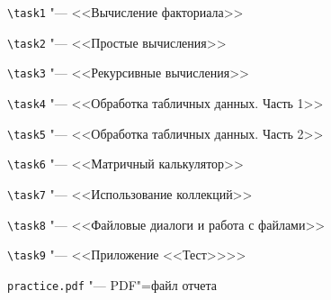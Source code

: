\documentclass[bachelor, och, pract]{SCWorks}
\begin{document}
\begin{desciption}
	\item \verb|\task1| "--- <<Вычисление факториала>>
	\item \verb|\task2| "--- <<Простые вычисления>>
	\item \verb|\task3| "--- <<Рекурсивные вычисления>>
	\item \verb|\task4| "--- <<Обработка табличных данных. Часть 1>>
	\item \verb|\task5| "--- <<Обработка табличных данных. Часть 2>>
	\item \verb|\task6| "--- <<Матричный калькулятор>>
	\item \verb|\task7| "--- <<Использование коллекций>>
	\item \verb|\task8| "--- <<Файловые диалоги и работа с файлами>>
	\item \verb|\task9| "--- <<Приложение <<Тест>>>>
	\item \verb|practice.pdf| "--- PDF"=файл отчета
\end{desciption}
%

%




\appendix
\end{document}
